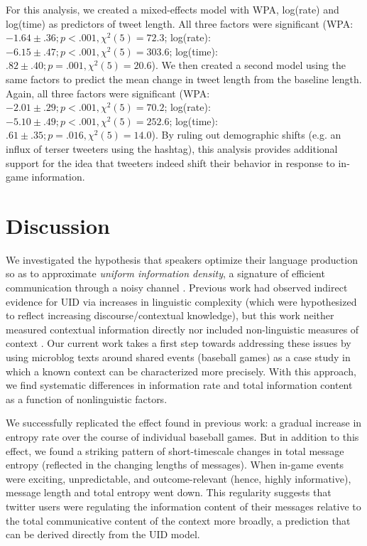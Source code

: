 \documentclass[11pt,letterpaper]{article}
\begin{document}
For this analysis, we created a mixed-effects model with WPA, log(rate) and log(time) as predictors of tweet length.  All three factors were significant (WPA: $-1.64 \pm .36; p<.001, \chi^2(5)=72.3$; log(rate): $-6.15 \pm .47; p<.001, \chi^2(5) =303.6 $; log(time): $.82 \pm .40; p=.001, \chi^2(5)=20.6$).  We then created a second model using the same factors to predict the mean change in tweet length from the baseline length. Again, all three factors were significant (WPA: $-2.01 \pm .29; p<.001, \chi^2(5)=70.2$; log(rate): $-5.10 \pm .49; p<.001, \chi^2(5) = 252.6$; log(time): $.61 \pm .35; p=.016, \chi^2(5)=14.0$).  By ruling out demographic shifts (e.g. an influx of terser tweeters using the hashtag), this analysis provides additional support for the idea that tweeters indeed shift their behavior in response to in-game information.

\section{Discussion}

We investigated the hypothesis that speakers optimize their language production so as to approximate \emph{uniform information density}, a signature of efficient communication through a noisy channel \cite{shannon1948,levy2007}. Previous work had observed indirect evidence for UID via increases in linguistic complexity (which were hypothesized to reflect increasing discourse/contextual knowledge), but this work neither measured contextual information directly nor included non-linguistic measures of context \cite{genzel2002,genzel2003,qian2012}. Our current work takes a first step towards addressing these issues by using microblog texts around shared events (baseball games) as a case study in which a known context can be characterized more precisely. With this approach, we find systematic differences in information rate and total information content as a function of nonlinguistic factors. 

We successfully replicated the effect found in previous work: a gradual increase in entropy rate over the course of individual baseball games. But in addition to this effect, we found a striking pattern of short-timescale changes in total message entropy (reflected in the changing lengths of messages). When in-game events were exciting, unpredictable, and outcome-relevant (hence, highly informative), message length and total entropy went down. This regularity suggests that twitter users were regulating the information content of their messages relative to the total communicative content of the context more broadly, a prediction that can be derived directly from the UID model. 
\end{document}
